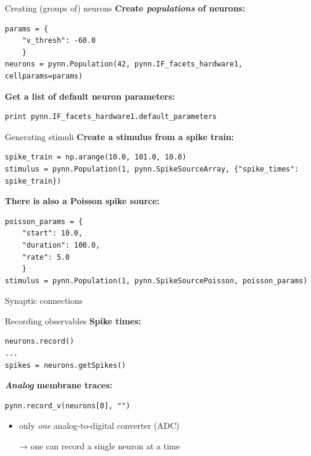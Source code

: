 \documentclass[aspectratio=169]{beamer}
\begin{document}
\begin{frame}[fragile]{Creating (groups of) neurons}
	\textbf{Create \emph{populations} of neurons:}
	\begin{verbatim}
params = {
    "v_thresh": -60.0
    }
neurons = pynn.Population(42, pynn.IF_facets_hardware1, cellparams=params)
	\end{verbatim}

	\vspace{3ex}

	\textbf{Get a list of default neuron parameters:}
	\begin{verbatim}
print pynn.IF_facets_hardware1.default_parameters
	\end{verbatim}
\end{frame}

\begin{frame}[fragile]{Generating stimuli}
	\textbf{Create a stimulus from a spike train:}
	\begin{verbatim}
spike_train = np.arange(10.0, 101.0, 10.0)
stimulus = pynn.Population(1, pynn.SpikeSourceArray, {"spike_times": spike_train})
	\end{verbatim}

	\vspace{3ex}

	\textbf{There is also a Poisson spike source:}
	\begin{verbatim}
poisson_params = {
    "start": 10.0,
    "duration": 100.0,
    "rate": 5.0
    }
stimulus = pynn.Population(1, pynn.SpikeSourcePoisson, poisson_params)
	\end{verbatim}
\end{frame}

\begin{frame}[fragile]{Synaptic connections}
\end{frame}

\begin{frame}[fragile]{Recording observables}
	\textbf{Spike times:}
	\begin{verbatim}
neurons.record()
...
spikes = neurons.getSpikes()
	\end{verbatim}

	\vspace{3ex}
	
	\textbf{\emph{Analog} membrane traces:}
	\begin{verbatim}
pynn.record_v(neurons[0], "")
	\end{verbatim}
	\begin{itemize}
		\item only \emph{one} analog-to-digital converter (ADC)
		\item[→] one can record a single neuron at a time
	\end{itemize}
\end{frame}
\end{document}
